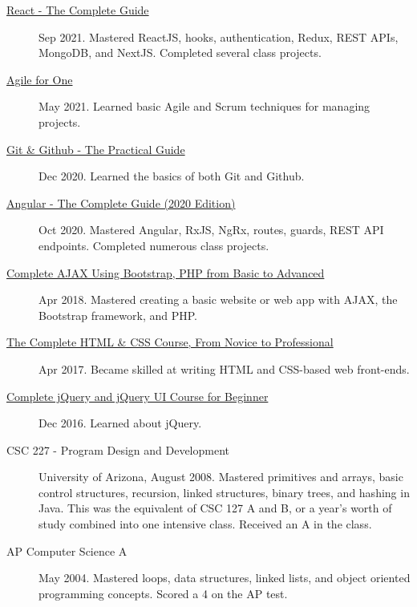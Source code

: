 \documentclass{article}
\begin{document}
\begin{description}
  \item [\href{https://www.udemy.com/certificate/UC-2196f0cf-2dce-4a11-9d8e-421827506ad1/}{React - The Complete Guide}] Sep 2021. Mastered ReactJS, hooks, authentication, Redux, REST APIs, MongoDB, and NextJS. Completed several class projects.
  \item [\href{https://sirkoik.github.io/CurriculumVitae/certifications/Agile-for-One/certificate.pdf}{Agile for One}] May 2021. Learned basic Agile and Scrum techniques for managing projects.
  \item [\href{https://sirkoik.github.io/CurriculumVitae/certifications/certificate-of-completion-for-git-github-the-practical-guide.pdf}{Git \& Github - The Practical Guide}] Dec 2020. Learned the basics of both Git and Github.
  \item [\href{https://www.udemy.com/certificate/UC-624f6f83-940e-428f-accd-d16113661ded}{Angular - The Complete Guide (2020 Edition)}] Oct 2020. Mastered Angular, RxJS, NgRx, routes, guards, REST API endpoints. Completed numerous class projects.
  \item [\href{https://www.udemy.com/certificate/UC-E3EMJE4O}{Complete AJAX Using Bootstrap, PHP from Basic to Advanced}] Apr 2018. Mastered creating a basic website or web app with AJAX, the Bootstrap framework, and PHP.
  \item [\href{https://www.udemy.com/certificate/UC-QZDWYX3V}{The Complete HTML \& CSS Course, From Novice to Professional}] Apr 2017. Became skilled at writing HTML and CSS-based web front-ends.
  \item [\href{https://www.udemy.com/certificate/UC-4V285L2N}{Complete jQuery and jQuery UI Course for Beginner}] Dec 2016. Learned about jQuery.
  \item [CSC 227 - Program Design and Development] University of Arizona, August 2008. Mastered primitives and arrays, basic control structures, recursion, linked structures, binary trees, and hashing in Java. This was the equivalent of CSC 127 A and B, or a year's worth of study combined into one intensive class. Received an A in the class.
  \item [AP Computer Science A] May 2004. Mastered loops, data structures, linked lists, and object oriented programming concepts. Scored a 4 on the AP test.
\end{description}
\end{document}
